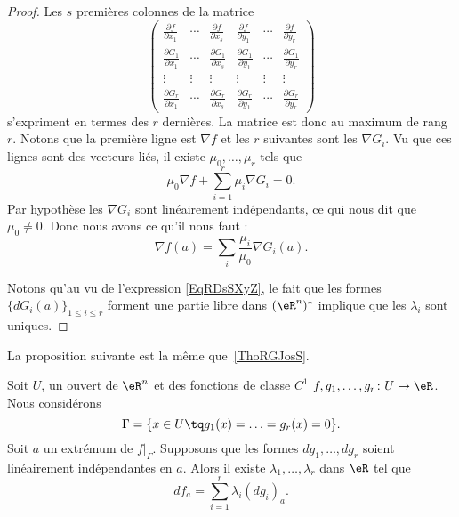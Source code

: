 \begin{proof}
    Les \( s\) premières colonnes de la matrice
    \begin{equation}
        \begin{pmatrix}
            \frac{ \partial f }{ \partial x_1 }   & \cdots  & \frac{ \partial f }{ \partial x_s }   & \frac{ \partial f }{ \partial y_1 }   & \cdots  & \frac{ \partial f }{ \partial y_r }   \\
            \frac{ \partial G_1 }{ \partial x_1 } & \cdots  & \frac{ \partial G_1 }{ \partial x_s } & \frac{ \partial G_1 }{ \partial y_1 } & \cdots  & \frac{ \partial G_1 }{ \partial y_r } \\
            \vdots    &   \vdots    &   \vdots    & \vdots  & \vdots                                & \vdots                                \\
            \frac{ \partial G_r }{ \partial x_1 } & \cdots  & \frac{ \partial G_r }{ \partial x_s } & \frac{ \partial G_r }{ \partial y_1 } & \cdots  & \frac{ \partial G_r }{ \partial y_r }
        \end{pmatrix}
    \end{equation}
    s'expriment en termes des \( r\) dernières. La matrice est donc au maximum de rang \( r\). Notons que la première ligne est \( \nabla f\) et les \( r\) suivantes sont les \( \nabla G_i\). Vu que ces lignes sont des vecteurs liés, il existe \( \mu_0,\ldots, \mu_r\) tels que
    \begin{equation}
        \mu_0\nabla f+\sum_{i=1}^r\mu_i\nabla G_i=0.
    \end{equation}
    Par hypothèse les \( \nabla G_i\) sont linéairement indépendants, ce qui nous dit que \( \mu_0\neq 0\). Donc nous avons ce qu'il nous faut :
    \begin{equation}
        \nabla f(a)=\sum_i\frac{ \mu_i }{ \mu_0 } \nabla G_i(a).
    \end{equation}

    Notons qu'au vu de l'expression \eqref{EqRDsSXyZ}, le fait que les formes \( \{ dG_i(a) \}_{1\leq i\leq r}\) forment une partie libre dans \( (\eR^n)^*\) implique que les \( \lambda_i\) sont uniques.
\end{proof}

La proposition suivante est la même que~\ref{ThoRGJosS}.
\begin{proposition} \label{PropfPPUxh}
    Soit \( U\), un ouvert de \( \eR^n\) et des fonctions de classe \( C^1\) \( f,g_1,\ldots, g_r\colon U\to \eR\). Nous considérons
    \begin{equation}
        \Gamma=\{ x\in U\tq g_1(x)=\ldots=g_r(x)=0 \}.
    \end{equation}
    Soit \( a\) un extrémum de \( f|_{\Gamma}\). Supposons que les formes \( dg_1,\ldots, dg_r\) soient linéairement indépendantes en \( a\). Alors il existe \( \lambda_1,\ldots, \lambda_r\) dans \( \eR\) tel que
    \begin{equation}
        df_a=\sum_{i=1}^r\lambda_i(dg_i)_a.
    \end{equation}
\end{proposition}

